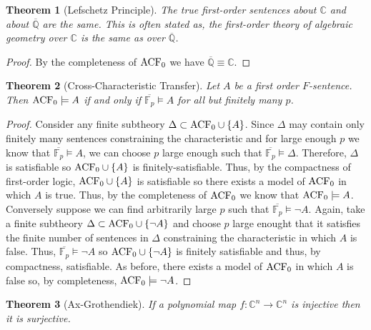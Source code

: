 \documentclass[12pt]{article}
\newcommand{\C}{\mathbb{C}}
\newcommand{\Q}{\mathbb{Q}}
\newcommand{\finfield}[1]{\mathbb{F}_{#1}}
\newcommand{\entails}{\models}
\theoremstyle{theorem}
\newtheorem{theorem}{Theorem}[section]
\theoremstyle{definition}
\theoremstyle{definition}
\theoremstyle{remark}
\theoremstyle{definition}
\theoremstyle{remark}
\begin{document}
\begin{theorem}[Lefschetz Principle]
The true first-order sentences about $\C$ and about $\overline{\Q}$ are the same. This is often stated as, the first-order theory of algebraic geometry over $\C$ is the same as over $\overline{\Q}$.
\end{theorem}

\begin{proof}
By the completeness of $\mathrm{ACF}_{0}$ we have $\overline{\Q} \equiv \C$. 
\end{proof}

\begin{theorem}[Cross-Characteristic Transfer]
Let $A$ be a first order $F$-sentence. Then $\ACF{0} \entails A$ if and only if $\overline{\finfield{p}} \entails A$ for all but finitely many $p$.   
\end{theorem}

\begin{proof}
Consider any finite subtheory $\Delta \subset \mathrm{ACF}_{0} \cup \{A\}$. Since $\Delta$ may contain only finitely many sentences constraining the characteristic and for large enough $p$ we know that $\overline{\finfield{p}} \entails A$, we can choose $p$ large enough such that $\overline{\finfield{p}}  \entails \Delta$. Therefore, $\Delta$ is satisfiable so $\mathrm{ACF}_{0} \cup \{A\}$ is finitely-satisfiable. Thus, by the compactness of first-order logic, $\mathrm{ACF}_{0} \cup \{A\}$ is satisfiable so there exists a model of $\mathrm{ACF}_{0}$ in which $A$ is true. Thus, by the completeness of $\mathrm{ACF}_{0}$ we know that $\ACF{0} \entails A$.   
\bigskip\\
Conversely suppose we can find arbitrarily large $p$ such that $\overline{\finfield{p}} \entails \neg A$. Again, take a finite subtheory $\Delta \subset \mathrm{ACF}_{0} \cup \{\neg A\}$ and choose $p$ large enought that it satisfies the finite number of sentences in $\Delta$ constraining the characteristic in which $A$ is false. Thus, $\overline{\finfield{p}} \entails \neg A$ so $\mathrm{ACF}_{0} \cup \{\neg A\}$ is finitely satisfiable and thus, by compactness, satisfiable. As before, there exists a model of $\mathrm{ACF}_{0}$ in which $A$ is false so, by completeness, $\ACF{0} \entails \neg A$. 
\end{proof}

\begin{theorem}[Ax-Grothendiek]
If a polynomial map $f : \C^n \to \C^n$ is injective then it is surjective.
\end{theorem}
\end{document}
